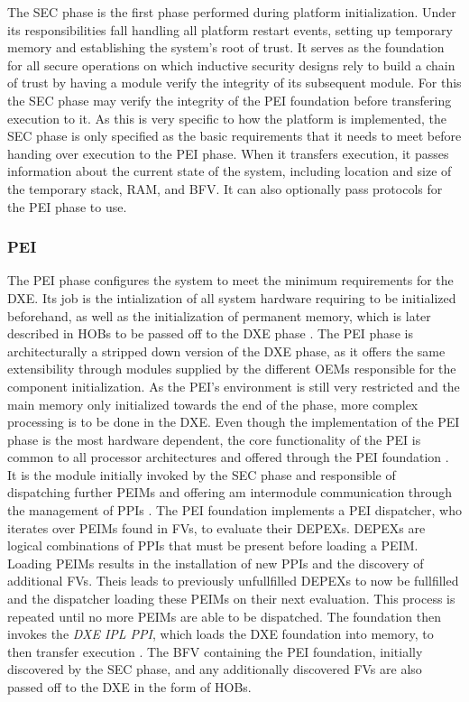 The \ac{SEC} phase is the first phase performed during platform initialization.
Under its responsibilities fall handling all platform restart events, setting up temporary memory and establishing the system's root of trust.
It serves as the foundation for all secure operations on which inductive security designs rely to build a chain of trust by having a module verify the integrity of its subsequent module.
For this the \ac{SEC} phase may verify the integrity of the \ac{PEI} foundation before transfering execution to it.
As this is very specific to how the platform is implemented, the \ac{SEC} phase is only specified as the basic requirements that it needs to meet before handing over execution to the \ac{PEI} phase.
When it transfers execution, it passes information about the current state of the system, including location and size of the temporary stack, \ac{RAM}, and \ac{BFV}.
It can also optionally pass protocols for the \ac{PEI} phase to use.

\subsubsection{\acf{PEI}}

The \ac{PEI} phase configures the system to meet the minimum requirements for the \ac{DXE}.
Its job is the intialization of all system hardware requiring to be initialized beforehand, as well as the initialization of permanent memory, which is later described in \acp{HOB} to be passed off to the \ac{DXE} phase \cite[Vol. 1, 2.1]{pi-spec}.
The \ac{PEI} phase is architecturally a stripped down version of the \ac{DXE} phase, as it offers the same extensibility through modules supplied by the different \acp{OEM} responsible for the component initialization.
As the \ac{PEI}'s environment is still very restricted and the main memory only initialized towards the end of the phase, more complex processing is to be done in the \ac{DXE}.
Even though the implementation of the \ac{PEI} phase is the most hardware dependent, the core functionality of the \ac{PEI} is common to all processor architectures and offered through the \ac{PEI} foundation \cite[Vol. 1, 2.2]{pi-spec}.
It is the module initially invoked by the \ac{SEC} phase and responsible of dispatching further \acp{PEIM} and offering am intermodule communication through the management of \acp{PPI} \cite[Vol. 1, 2.5]{pi-spec}.
The \ac{PEI} foundation implements a \ac{PEI} dispatcher, who iterates over \acp{PEIM} found in \acp{FV}, to evaluate their \acp{DEPEX}.
\acp{DEPEX} are logical combinations of \acp{PPI} that must be present before loading a \ac{PEIM}.
Loading \acp{PEIM} results in the installation of new \acp{PPI} and the discovery of additional \acp{FV}.
Theis leads to previously unfullfilled \acp{DEPEX} to now be fullfilled and the dispatcher loading these \acp{PEIM} on their next evaluation.
This process is repeated until no more \acp{PEIM} are able to be dispatched.
The foundation then invokes the \emph{\ac{DXE} IPL \ac{PPI}}, which loads the \ac{DXE} foundation into memory, to then transfer execution \cite[Vol. 1, 2.6]{pi-spec}.
The \ac{BFV} containing the \ac{PEI} foundation, initially discovered by the \ac{SEC} phase, and any additionally discovered \acp{FV} are also passed off to the \ac{DXE} in the form of \acp{HOB}.

